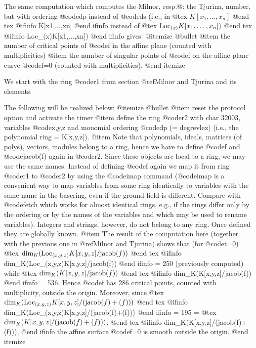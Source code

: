 The same computation which computes the Milnor, resp.@: the Tjurina,
number, but with ordering @code{dp} instead of @code{ds} (i.e., in
@tex
$K[x_1,\ldots,x_n]$
@end tex
@ifinfo
K[x1,...,xn]
@end ifinfo
instead of
@tex
$\hbox{Loc}_{(x)}K[x_1,\ldots,x_n])$
@end tex
@ifinfo
Loc_(x)K[x1,...,xn])
@end ifinfo
gives:
@itemize @bullet
@item
the number of critical points of @code{f} in the affine plane
(counted with multiplicities)
@item
the number of singular points of @code{f} on the affine plane curve @code{f}=0
(counted with multiplicities).
@end itemize

We start with the ring @code{r1} from section @ref{Milnor and Tjurina} and its elements.

The following will be realized below:
@itemize @bullet
@item
reset the protocol option and activate the timer
@item
define the ring @code{r2} with char 32003, variables @code{x,y,z} and monomial
  ordering @code{dp} (= degrevlex) (i.e., the polynomial ring = K[x,y,z]).
@item
Note that polynomials, ideals, matrices (of polys), vectors,
  modules belong to a ring, hence we have to define @code{f} and @code{jacob(f)}
  again in @code{r2}. Since these objects are local to a ring, we may use
  the same names.
  Instead of defining @code{f} again we map it from ring @code{r1} to @code{r2}
  by using the @code{imap} command
  (@code{imap} is a convenient way to map variables
  from some ring identically to variables with the same name in the
  basering, even if the ground field is different. Compare with @code{fetch}
  which works for almost identical rings,
  e.g., if the rings differ only by the ordering or by the names of the
  variables and which may be used to rename variables).
  Integers and strings, however, do not belong to any ring. Once
  defined they are globally known.
@item
The result of the computation here (together with the previous one in
 @ref{Milnor and Tjurina}) shows that (for @code{t}=0)
@tex
$\hbox{dim}_K(\hbox{Loc}_{(x,y,z)}K[x,y,z]/\hbox{jacob}(f))$
@end tex
@ifinfo
  dim_K(Loc_(x,y,z)K[x,y,z]/jacob(f))
@end ifinfo
= 250 (previously computed) while
@tex
$\hbox{dim}_K(K[x,y,z]/\hbox{jacob}(f))$
@end tex
@ifinfo
  dim_K(K[x,y,z]/jacob(f))
@end ifinfo
= 536. Hence @code{f} has 286 critical points,
  counted with multiplicity, outside the origin.
  Moreover, since
@tex
$\hbox{dim}_K(\hbox{Loc}_{(x,y,z)}K[x,y,z]/(\hbox{jacob}(f)+(f)))$
@end tex
@ifinfo
dim_K(Loc_(x,y,z)K[x,y,z]/(jacob(f)+(f)))
@end ifinfo
= 195 =
@tex
$\hbox{dim}_K(K[x,y,z]/(\hbox{jacob}(f)+(f)))$,
@end tex
@ifinfo
dim_K(K[x,y,z]/(jacob(f)+(f))),
@end ifinfo
the affine surface @code{f}=0 is smooth outside the origin.
@end itemize

